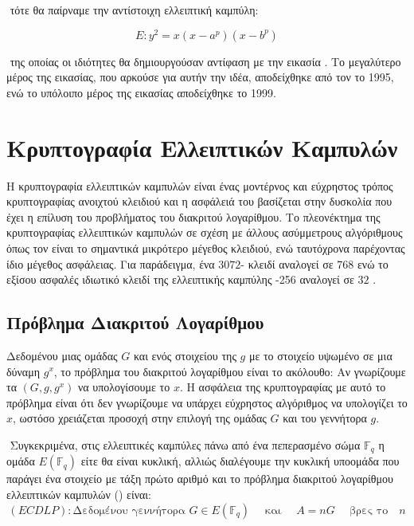 \documentclass[oneside,a4paper]{article}
\begin{document}
$ $\newline
τότε θα παίρναμε την αντίστοιχη ελλειπτική καμπύλη:

$$E: y^2 = x(x-a^p)(x-b^p)$$

$ $\newline
της οποίας οι ιδιότητες θα δημιουργούσαν αντίφαση με την εικασία . Το μεγαλύτερο μέρος της εικασίας, που αρκούσε για αυτήν την ιδέα, αποδείχθηκε από τον  το 1995, ενώ το υπόλοιπο μέρος της εικασίας αποδείχθηκε το 1999.





\pagebreak
\section{Κρυπτογραφία Ελλειπτικών Καμπυλών}

\vspace*{0.3cm}
\noindent Η κρυπτογραφία ελλειπτικών καμπυλών είναι ένας μοντέρνος και εύχρηστος τρόπος κρυπτογραφίας ανοιχτού κλειδιού και η ασφάλειά του βασίζεται στην δυσκολία που έχει η επίλυση του προβλήματος του διακριτού λογαρίθμου. Το πλεονέκτημα της κρυπτογραφίας ελλειπτικών καμπυλών σε σχέση με άλλους ασύμμετρους αλγόριθμους όπως τον  είναι το σημαντικά μικρότερο μέγεθος κλειδιού, ενώ ταυτόχρονα παρέχοντας ίδιο μέγεθος ασφάλειας. Για παράδειγμα, ένα $3072$- κλειδί  αναλογεί σε 768  ενώ το εξίσου ασφαλές ιδιωτικό κλειδί της ελλειπτικής καμπύλης -256 αναλογεί σε $32$ .

\subsection{Πρόβλημα Διακριτού Λογαρίθμου}

\vspace*{0.3cm}
Δεδομένου μιας ομάδας $G$ και ενός στοιχείου της $g$ με το στοιχείο υψωμένο σε μια δύναμη $g^x$, το πρόβλημα του διακριτού λογαρίθμου είναι το ακόλουθο: Αν γνωρίζουμε τα $(G,g,g^x)$ να υπολογίσουμε το $x$. Η ασφάλεια της κρυπτογραφίας με αυτό το πρόβλημα είναι ότι δεν γνωρίζουμε να υπάρχει εύχρηστος αλγόριθμος να υπολογίζει το $x$, ωστόσο χρειάζεται προσοχή στην επιλογή της ομάδας $G$ και του γεννήτορα $g$.

$ $\newline
Συγκεκριμένα, στις ελλειπτικές καμπύλες πάνω από ένα πεπερασμένο σώμα $\mathbb{F}_q$ η ομάδα $E(\mathbb{F}_q)$ είτε θα είναι κυκλική, αλλιώς διαλέγουμε την κυκλική υποομάδα που παράγει ένα στοιχείο με τάξη πρώτο αριθμό και το πρόβλημα διακριτού λογαρίθμου ελλειπτικών καμπυλών () είναι:
$$ (ECDLP): \text{Δεδομένου γεννήτορα } G \in E(\mathbb{F}_q) \quad \text{ και } \quad A = n G \quad \text{ βρες το} \quad n $$ 
\end{document}
